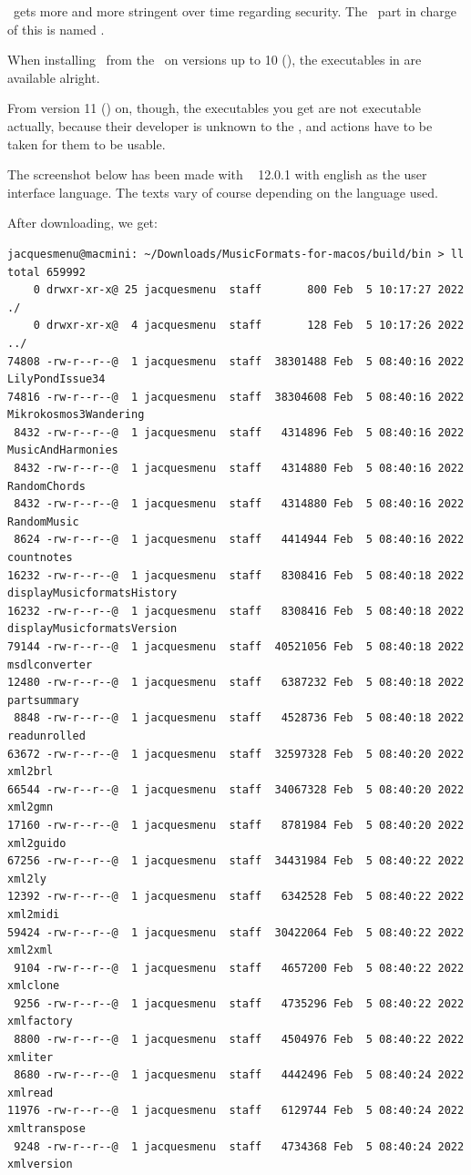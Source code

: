 \MacOS\ gets more and more stringent over time regarding security. The \OS\ part in charge of this is named \Gatekeeper. 

When installing \mf\ from the \repo\ on versions up to 10 (), the executables in  are available alright.

From version 11 () on, though, the executables you get are not executable actually, because their developer is unknown to the \OS, and actions have to be taken for them to be usable.

The screenshot below has been made with \MacOS\  12.0.1 with english as the user interface language. The texts vary of course depending on the language used.

After downloading, we get:
\begin{lstlisting}[language=Terminal]
jacquesmenu@macmini: ~/Downloads/MusicFormats-for-macos/build/bin > ll
total 659992
    0 drwxr-xr-x@ 25 jacquesmenu  staff       800 Feb  5 10:17:27 2022 ./
    0 drwxr-xr-x@  4 jacquesmenu  staff       128 Feb  5 10:17:26 2022 ../
74808 -rw-r--r--@  1 jacquesmenu  staff  38301488 Feb  5 08:40:16 2022 LilyPondIssue34
74816 -rw-r--r--@  1 jacquesmenu  staff  38304608 Feb  5 08:40:16 2022 Mikrokosmos3Wandering
 8432 -rw-r--r--@  1 jacquesmenu  staff   4314896 Feb  5 08:40:16 2022 MusicAndHarmonies
 8432 -rw-r--r--@  1 jacquesmenu  staff   4314880 Feb  5 08:40:16 2022 RandomChords
 8432 -rw-r--r--@  1 jacquesmenu  staff   4314880 Feb  5 08:40:16 2022 RandomMusic
 8624 -rw-r--r--@  1 jacquesmenu  staff   4414944 Feb  5 08:40:16 2022 countnotes
16232 -rw-r--r--@  1 jacquesmenu  staff   8308416 Feb  5 08:40:18 2022 displayMusicformatsHistory
16232 -rw-r--r--@  1 jacquesmenu  staff   8308416 Feb  5 08:40:18 2022 displayMusicformatsVersion
79144 -rw-r--r--@  1 jacquesmenu  staff  40521056 Feb  5 08:40:18 2022 msdlconverter
12480 -rw-r--r--@  1 jacquesmenu  staff   6387232 Feb  5 08:40:18 2022 partsummary
 8848 -rw-r--r--@  1 jacquesmenu  staff   4528736 Feb  5 08:40:18 2022 readunrolled
63672 -rw-r--r--@  1 jacquesmenu  staff  32597328 Feb  5 08:40:20 2022 xml2brl
66544 -rw-r--r--@  1 jacquesmenu  staff  34067328 Feb  5 08:40:20 2022 xml2gmn
17160 -rw-r--r--@  1 jacquesmenu  staff   8781984 Feb  5 08:40:20 2022 xml2guido
67256 -rw-r--r--@  1 jacquesmenu  staff  34431984 Feb  5 08:40:22 2022 xml2ly
12392 -rw-r--r--@  1 jacquesmenu  staff   6342528 Feb  5 08:40:22 2022 xml2midi
59424 -rw-r--r--@  1 jacquesmenu  staff  30422064 Feb  5 08:40:22 2022 xml2xml
 9104 -rw-r--r--@  1 jacquesmenu  staff   4657200 Feb  5 08:40:22 2022 xmlclone
 9256 -rw-r--r--@  1 jacquesmenu  staff   4735296 Feb  5 08:40:22 2022 xmlfactory
 8800 -rw-r--r--@  1 jacquesmenu  staff   4504976 Feb  5 08:40:22 2022 xmliter
 8680 -rw-r--r--@  1 jacquesmenu  staff   4442496 Feb  5 08:40:24 2022 xmlread
11976 -rw-r--r--@  1 jacquesmenu  staff   6129744 Feb  5 08:40:24 2022 xmltranspose
 9248 -rw-r--r--@  1 jacquesmenu  staff   4734368 Feb  5 08:40:24 2022 xmlversion
\end{lstlisting}

